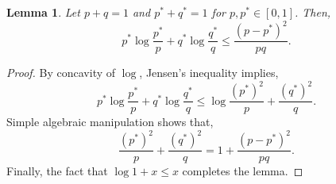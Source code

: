 \documentclass{article}
\newtheorem{lemma}{Lemma}
\begin{document}
\begin{lemma}\label{lem:appx1}
Let $p+q=1$ and $p^*+q^*=1$ for $p,p^* \in [0,1]$.  Then,
$$p^* \log \frac{p^*}{p} + q^* \log \frac{q^*}{q} \leq \frac{(p-p^*)^2}{pq}.$$
\end{lemma}
\begin{proof}
By concavity of $\log$, Jensen's inequality implies,
$$p^* \log \frac{p^*}{p} + q^* \log \frac{q^*}{q}  \leq \log \frac{(p^*)^2}{p} + \frac{(q^*)^2}{q}.$$
Simple algebraic manipulation shows that,
$$\frac{(p^*)^2}{p} + \frac{(q^*)^2}{q} = 1 + \frac{(p-p^*)^2}{pq}.$$
Finally, the fact that $\log 1+x \leq x$ completes the lemma.
\end{proof}





\end{document}

